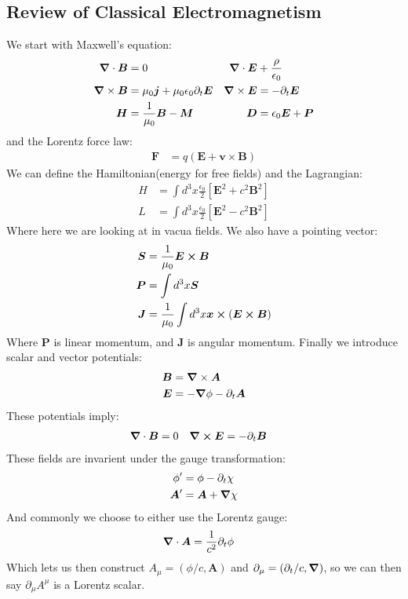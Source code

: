 \subsection{Review of Classical Electromagnetism}
We start with Maxwell's equation:
\begin{align*}
	\bm{\nabla}\cdot\bm{B} &=0 & \bm{\nabla}\cdot\bm{E} &+ \frac{\rho}{\epsilon_0} \\
	\bm{\nabla}\times\bm{B} &= \mu_0\bm{j} + \mu_0\epsilon_0\partial_t \bm{E} &
	\bm{\nabla}\times\bm{E} &= - \partial_t \bm{E} \\
	\bm{H} &= \frac{1}{\mu_0} \bm{B} - \bm{M} &
	\bm{D} &= \epsilon_0\bm{E} + \bm{P}
\end{align*}
and the Lorentz force law:
\begin{align*}
	\bm{F} &= q(\bm{E} + \bm{v}\times\bm{B})
\end{align*}
We can define the Hamiltonian(energy for free fields) and the Lagrangian:
\begin{align*}
	H &= \int d^3x \frac{\epsilon_0}{2}\left[\bm{E}^2 + c^2\bm{B}^2\right] \\
	L &= \int d^3x \frac{\epsilon_0}{2}\left[\bm{E}^2 - c^2 \bm{B}^2\right]
\end{align*}
Where here we are looking at in vacua fields. We also have a pointing vector:
\begin{align*}
	\bm{S} &= \frac{1}{\mu_0}\bm{E}\cross\bm{B} \\
	\bm{P} &= \int d^3 x \bm{S} \\
	\bm{J} &= \frac{1}{\mu_0}\int d^3 x\bm{x} \cross (\bm{E}\cross\bm{B})
\end{align*}
Where $\bm{P}$ is linear momentum, and $\bm{J}$ is angular momentum. Finally we introduce scalar and vector potentials:
\begin{align*}
	\bm{B} &= \bm{\nabla}\times\bm{A} \\
	\bm{E} &= -\bm{\nabla}\phi - \partial_t \bm{A}
\end{align*}
These potentials imply:
\begin{align*}
	\bm{\nabla}\cdot\bm{B} &= 0 &
	\bm{\nabla}\cross\bm{E} &= -\partial_t \bm{B}
\end{align*}
These fields are invarient under the gauge transformation:
\begin{align*}
	\phi' &= \phi - \partial_t \chi \\
	\bm{A}' &= \bm{A} +\bm{\nabla}\chi
\end{align*}
And commonly we choose to either use the Lorentz gauge:
\begin{align*}
	\bm{\nabla}\cdot\bm{A} &= \frac{1}{c^2} \partial_t\phi
\end{align*}
Which lets us then construct $A_\mu = (\phi/c,\bm{A})$ and $\partial_\mu =(\partial_t/c,\bm{\nabla})$, so we can then say $\partial_\mu A^\mu$ is a Lorentz scalar. 

